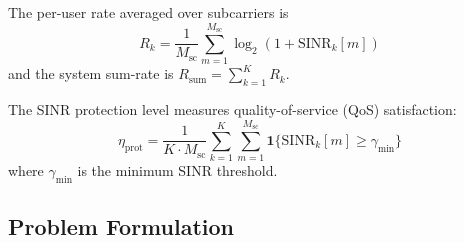 \documentclass[journal,twocolumn]{IEEEtran}
\begin{document}
The per-user rate averaged over subcarriers is
\begin{equation}
R_k = \frac{1}{M_{\text{sc}}}\sum_{m=1}^{M_{\text{sc}}} \log_2(1 + \text{SINR}_k[m])
\label{eq:rate}
\end{equation}
and the system sum-rate is $R_{\text{sum}} = \sum_{k=1}^{K} R_k$.

The SINR protection level measures quality-of-service (QoS) satisfaction:
\begin{equation}
\eta_{\text{prot}} = \frac{1}{K \cdot M_{\text{sc}}}\sum_{k=1}^{K}\sum_{m=1}^{M_{\text{sc}}} \mathbf{1}\{\text{SINR}_k[m] \geq \gamma_{\min}\}
\label{eq:protection}
\end{equation}
where $\gamma_{\min}$ is the minimum SINR threshold.

\subsection{Problem Formulation}
\end{document}
